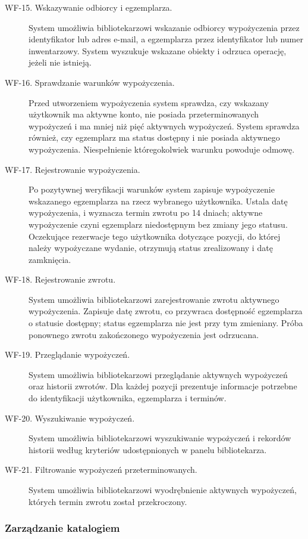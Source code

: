 \documentclass[11pt, a4paper]{article}
\begin{document}
\begin{description}
\item[WF-15. Wskazywanie odbiorcy i egzemplarza.] System umożliwia bibliotekarzowi wskazanie odbiorcy wypożyczenia przez identyfikator lub adres e-mail, a egzemplarza przez identyfikator lub numer inwentarzowy. System wyszukuje wskazane obiekty i odrzuca operację, jeżeli nie istnieją.
\item[WF-16. Sprawdzanie warunków wypożyczenia.] Przed utworzeniem wypożyczenia system sprawdza, czy wskazany użytkownik ma aktywne konto, nie posiada przeterminowanych wypożyczeń i ma mniej niż pięć aktywnych wypożyczeń. System sprawdza również, czy egzemplarz ma status dostępny i nie posiada aktywnego wypożyczenia. Niespełnienie któregokolwiek warunku powoduje odmowę.
\item[WF-17. Rejestrowanie wypożyczenia.] Po pozytywnej weryfikacji warunków system zapisuje wypożyczenie wskazanego egzemplarza na rzecz wybranego użytkownika. Ustala datę wypożyczenia, i wyznacza termin zwrotu po 14 dniach; aktywne wypożyczenie czyni egzemplarz niedostępnym bez zmiany jego statusu. Oczekujące rezerwacje tego użytkownika dotyczące pozycji, do której należy wypożyczane wydanie, otrzymują status zrealizowany i datę zamknięcia.
\item[WF-18. Rejestrowanie zwrotu.] System umożliwia bibliotekarzowi zarejestrowanie zwrotu aktywnego wypożyczenia. Zapisuje datę zwrotu, co przywraca dostępność egzemplarza o statusie dostępny; status egzemplarza nie jest przy tym zmieniany. Próba ponownego zwrotu zakończonego wypożyczenia jest odrzucana.
\item[WF-19. Przeglądanie wypożyczeń.] System umożliwia bibliotekarzowi przeglądanie aktywnych wypożyczeń oraz historii zwrotów. Dla każdej pozycji prezentuje informacje potrzebne do identyfikacji użytkownika, egzemplarza i terminów.
\item[WF-20. Wyszukiwanie wypożyczeń.] System umożliwia bibliotekarzowi wyszukiwanie wypożyczeń i rekordów historii według kryteriów udostępnionych w panelu bibliotekarza.
\item[WF-21. Filtrowanie wypożyczeń przeterminowanych.] System umożliwia bibliotekarzowi wyodrębnienie aktywnych wypożyczeń, których termin zwrotu został przekroczony.
\end{description}

\subsubsection{Zarządzanie katalogiem}
\end{document}
